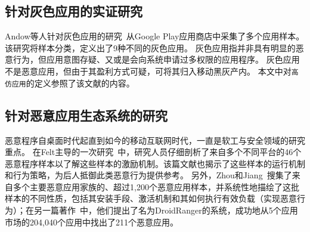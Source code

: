 \subsection{针对灰色应用的实证研究}
Andow等人针对灰色应用的研究~\cite{Andow2016ASO}从Google Play应用商店中采集了多个应用样本。
该研究将样本分类，定义出了9种不同的灰色应用。
灰色应用指并非具有明显的恶意行为，但应用意图存疑、又或是会向系统申请过多权限的应用程序。
灰色应用不是恶意应用，但由于其盈利方式可疑，可将其归入移动黑灰产内。
本文中对\texttt{高仿应用}的定义参照了该文献的内容。

\subsection{针对恶意应用生态系统的研究}
恶意程序自桌面时代起直到如今的移动互联网时代，一直是软工与安全领域的研究重点。
在Felt主导的一次研究~\cite{Felt2011ASO}中，研究人员仔细剖析了来自多个不同平台的46个恶意程序样本以了解这些样本的激励机制。该篇文献也揭示了这些样本的运行机制和行为策略，为后人抵御此类恶意行为提供参考。
另外，Zhou和Jiang~\cite{Zhou2012DissectingAM}搜集了来自多个主要恶意应用家族的、超过1,200个恶意应用样本，并系统性地描绘了这批样本的不同性质，包括其安装手段、激活机制和其如何执行有效负载（实现恶意行为）；在另一篇著作~\cite{zhou2012hey}中，他们提出了名为DroidRanger的系统，成功地从5个应用市场的204,040个应用中找出了211个恶意应用。

